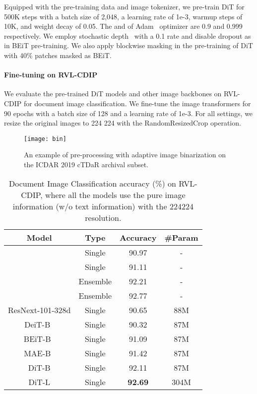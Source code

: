 \documentclass[sigconf]{acmart}
\begin{document}
Equipped with the pre-training data and image tokenizer, we pre-train DiT for 500K steps with a batch size of 2,048, a learning rate of 1e-3, warmup steps of 10K, and weight decay of 0.05. The  and  of Adam~\citep{Kingma2015AdamAM} optimizer are 0.9 and 0.999 respectively. We employ stochastic depth~\citep{Huang2016DeepNW} with a 0.1 rate and disable dropout as in BEiT pre-training. We also apply blockwise masking in the pre-training of DiT with 40\% patches masked as BEiT.

\paragraph{Fine-tuning on RVL-CDIP}
We evaluate the pre-trained DiT models and other image backbones on RVL-CDIP for document image classification. We fine-tune the image transformers for 90 epochs with a batch size of 128 and a learning rate of 1e-3. For all settings, we resize the original images to 224  224 with the RandomResizedCrop operation.


\begin{figure}[t]
    \centering   
	\texttt{[image: bin]}	
    \caption{An example of pre-processing with adaptive image binarization on the ICDAR 2019 cTDaR archival subset.}
    \label{bin}
\end{figure}

\begin{table}[t]
    \centering
    \begin{tabular}{cccc}
        \toprule
        \bf Model & \bf Type & \bf Accuracy & \bf \#Param \\
        \midrule
        \citep{Afzal2017CuttingTE}  & Single & 90.97 &  -\\
     \citep{Das2018DocumentIC}  & Single & 91.11 &- \\
     \citep{Das2018DocumentIC}  & Ensemble & 92.21 &- \\
\citep{ijcai2019-466}  & Ensemble & 92.77 &- \\
     \midrule
        
        ResNext-101-328d & Single & 90.65 & 88M \\
        
        DeiT-B~\citep{touvron2020deit} & Single &  90.32 & 87M \\
BEiT-B~\citep{bao2021beit}  & Single &  91.09 & 87M\\
        MAE-B~\citep{he2021masked}  & Single &  91.42 & 87M \\
\midrule
        DiT-B   & Single & 92.11 & 87M \\
        DiT-L   & Single & \bf92.69 & 304M \\


        \bottomrule
    \end{tabular}
    \caption{Document Image Classification accuracy (\%) on RVL-CDIP, where all the models use the pure image information (w/o text information) with the 224224 resolution.}
    \label{tab:rvlcdip}
\end{table}
\end{document}
